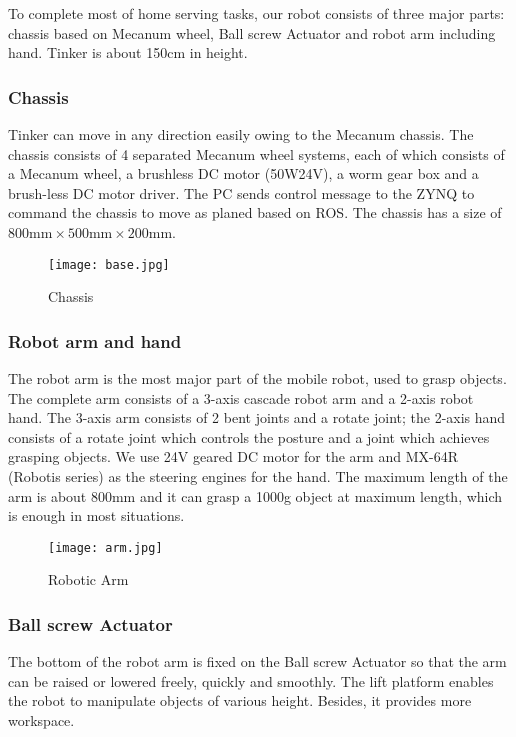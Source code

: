 To complete most of home serving tasks, our robot consists of three major parts: chassis based on Mecanum wheel, Ball screw Actuator and robot arm including hand. Tinker is about 150cm in height. 
\subsubsection{Chassis}
Tinker can move in any direction easily owing to the Mecanum chassis. The chassis consists of 4 separated Mecanum wheel systems, each of which consists of a Mecanum wheel, a brushless DC motor (50W24V), a worm gear box and a brush-less DC motor driver. The PC sends control message to the ZYNQ to command the chassis to move as planed based on ROS. The chassis has a size of $800\text{mm} \times 500\text{mm}\times 200\text{mm}$.
\begin{figure}[!t]
\centering
\texttt{[image: base.jpg]}
    \caption{Chassis}
\end{figure}

\subsubsection{Robot arm and hand}
The robot arm is the most major part of the mobile robot, used to grasp objects. The complete arm consists of a 3-axis cascade robot arm and a 2-axis robot hand. The 3-axis arm consists of 2 bent joints and a rotate joint; the 2-axis hand consists of a rotate joint which controls the posture and a joint which achieves grasping objects. We use 24V geared DC motor for the arm and MX-64R (Robotis series) as the steering engines for the hand. The maximum length of the arm is about 800mm and it can grasp a 1000g object at maximum length, which is enough in most situations. 
\begin{figure*}[!t]
	\centering
    \texttt{[image: arm.jpg]}
    \caption{Robotic Arm}
\end{figure*}

\subsubsection{Ball screw Actuator}
The bottom of the robot arm is fixed on the Ball screw Actuator so that the arm can be raised or lowered freely, quickly and smoothly. The lift platform enables the robot to manipulate objects of various height. Besides, it provides more workspace.


